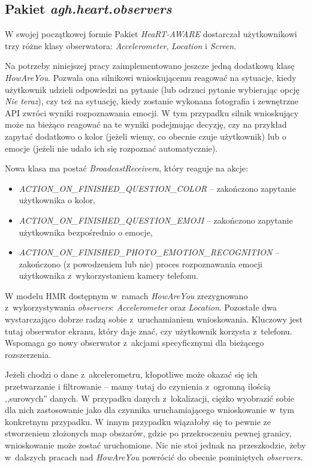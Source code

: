 \subsection{Pakiet \textit{agh.heart.observers}}

W swojej początkowej formie Pakiet \textit{HeaRT-AWARE} dostarczał użytkownikowi trzy różne klasy obserwatora: \textit{Accelerometer}, \textit{Location} i \textit{Screen}. 

Na potrzeby niniejszej pracy zaimplementowano jeszcze jedną dodatkową klasę \textit{HowAreYou}. Pozwala ona silnikowi wnioskującemu reagować na sytuacje, kiedy użytkownik udzieli odpowiedzi na pytanie (lub odrzuci pytanie wybierając opcję \textit{Nie teraz}), czy też na sytuację, kiedy zostanie wykonana fotografia i zewnętrzne API zwróci wyniki rozpoznawania emocji. W tym przypadku silnik wnioskujący może na bieżąco reagować na te wyniki podejmując decyzję, czy na przykład zapytać dodatkowo o kolor (jeżeli wiemy, co obecnie czuje użytkownik) lub o emocje (jeżeli nie udało ich się rozpoznać automatycznie). 

Nowa klasa ma postać \textit{BroadcastReceivera}, który reaguje na akcje:
\begin{itemize}
	\item \textit{ACTION\_ON\_FINISHED\_QUESTION\_COLOR} -- zakończono zapytanie użytkownika o kolor,
	\item \textit{ACTION\_ON\_FINISHED\_QUESTION\_EMOJI} -- zakończono zapytanie użytkownika bezpośrednio o emocje,
	\item \textit{ACTION\_ON\_FINISHED\_PHOTO\_EMOTION\_RECOGNITION} -- zakończono (z powodzeniem lub nie) proces rozpoznawania emocji użytkownika z~wykorzystaniem kamery telefonu.
\end{itemize}

W modelu HMR dostępnym w~ramach \textit{HowAreYou} zrezygnowano z~wykorzystywania \textit{observers}: \textit{Accelerometer} oraz \textit{Location}. Pozostałe dwa wystarczająco dobrze radzą sobie z~uruchamianiem wnioskowania. Kluczowy jest tutaj obserwator ekranu, który daje znać, czy użytkownik korzysta z~telefonu. Wspomaga go nowy obserwator z~akcjami specyficznymi dla bieżącego rozszerzenia. 

Jeżeli chodzi o dane z~akcelerometru, kłopotliwe może okazać się ich przetwarzanie i filtrowanie -- mamy tutaj do czynienia z~ogromną ilością ,,surowych'' danych. W przypadku danych z~lokalizacji, ciężko wyobrazić sobie dla nich zastosowanie jako dla czynnika uruchamiającego wnioskowanie w~tym konkretnym przypadku. W innym przypadku wiązałoby się to pewnie ze stworzeniem złożonych map obszarów, gdzie po przekroczeniu pewnej granicy, wnioskowanie może zostać uruchomione. Nic nie stoi jednak na przeszkodzie, żeby w~dalszych pracach nad \textit{HowAreYou} powrócić do obecnie pominiętych \textit{observers}.


